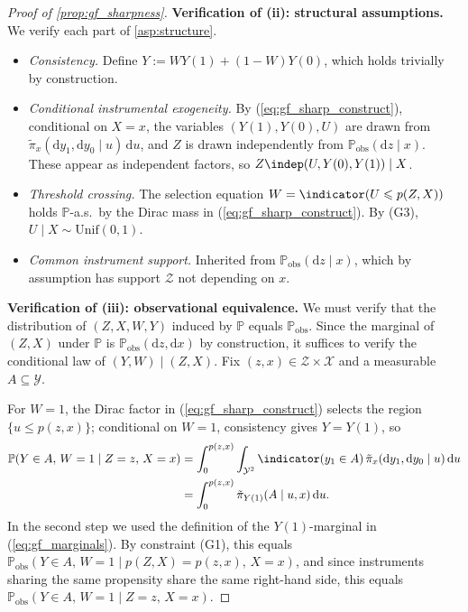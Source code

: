 \begin{proof}[Proof of \cref{prop:gf_sharpness}]
    \medskip
    \noindent\textbf{Verification of (ii): structural assumptions.}
    We verify each part of \cref{asp:structure}.
    \begin{itemize}
        \item \emph{Consistency.} Define $Y := W Y(1) + (1 - W) Y(0)$, which holds trivially by construction.
        \item \emph{Conditional instrumental exogeneity.} By (\ref{eq:gf_sharp_construct}), conditional on $X = x$, the variables $(Y(1), Y(0), U)$ are drawn from $\tilde{\pi}_x(\mathrm{d}y_1, \mathrm{d}y_0 \mid u)\, \mathrm{d}u$, and $Z$ is drawn independently from $\mathbb{P}_{\text{obs}}(\mathrm{d}z \mid x)$. These appear as independent factors, so $Z \indep (U, Y(0), Y(1)) \mid X$.
        \item \emph{Threshold crossing.} The selection equation $W = \indicator(U \leqslant p(Z, X))$ holds $\mathbb{P}$-a.s.\ by the Dirac mass in (\ref{eq:gf_sharp_construct}). By (G3), $U \mid X \sim \mathrm{Unif}(0,1)$.
        \item \emph{Common instrument support.} Inherited from $\mathbb{P}_{\text{obs}}(\mathrm{d}z \mid x)$, which by assumption has support $\mathcal{Z}$ not depending on $x$.
    \end{itemize}

    \medskip
    \noindent\textbf{Verification of (iii): observational equivalence.}
    We must verify that the distribution of $(Z, X, W, Y)$ induced by $\mathbb{P}$ equals $\mathbb{P}_{\text{obs}}$. Since the marginal of $(Z, X)$ under $\mathbb{P}$ is $\mathbb{P}_{\text{obs}}(\mathrm{d}z, \mathrm{d}x)$ by construction, it suffices to verify the conditional law of $(Y, W) \mid (Z, X)$. Fix $(z, x) \in \mathcal{Z} \times \mathcal{X}$ and a measurable $A \subseteq \mathcal{Y}$.

    For $W = 1$, the Dirac factor in (\ref{eq:gf_sharp_construct}) selects the region $\{u \leqslant p(z, x)\}$; conditional on $W = 1$, consistency gives $Y = Y(1)$, so
    \begin{align*}
        \mathbb{P}(Y \in A,\, W = 1 \mid Z = z,\, X = x)
        &= \int_0^{p(z,x)} \int_{\mathcal{Y}^2} \indicator(y_1 \in A)\, \tilde{\pi}_x(\mathrm{d}y_1, \mathrm{d}y_0 \mid u)\, \mathrm{d}u\\
        &= \int_0^{p(z,x)} \tilde{\pi}_{Y(1)}(A \mid u, x)\, \mathrm{d}u.
    \end{align*}
    In the second step we used the definition of the $Y(1)$-marginal in (\ref{eq:gf_marginals}). By constraint (G1), this equals $\mathbb{P}_{\text{obs}}(Y \in A,\, W = 1 \mid p(Z, X) = p(z, x),\, X = x)$, and since instruments sharing the same propensity share the same right-hand side, this equals $\mathbb{P}_{\text{obs}}(Y \in A,\, W = 1 \mid Z = z,\, X = x)$.


\end{proof}
